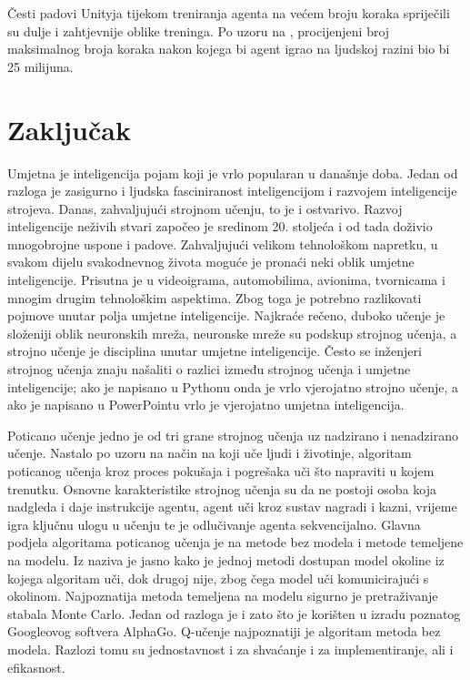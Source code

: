 \documentclass[]{foi} %
\begin{document}
Česti padovi Unityja tijekom treniranja agenta na većem broju koraka spriječili su dulje i zahtjevnije oblike treninga. Po uzoru na \cite{flappy}, procijenjeni broj maksimalnog broja koraka nakon kojega bi agent igrao na ljudskoj razini bio bi 25 milijuna.

\chapter{Zaključak}
Umjetna je inteligencija pojam koji je vrlo popularan u današnje doba. Jedan od razloga je zasigurno i ljudska fasciniranost inteligencijom i razvojem inteligencije strojeva. Danas, zahvaljujući strojnom učenju, to je i ostvarivo. Razvoj inteligencije neživih stvari započeo je sredinom 20. stoljeća i od tada doživio mnogobrojne uspone i padove. Zahvaljujući velikom tehnološkom napretku, u svakom dijelu svakodnevnog života moguće je pronaći neki oblik umjetne inteligencije. Prisutna je u videoigrama, automobilima, avionima, tvornicama i mnogim drugim tehnološkim aspektima. Zbog toga je potrebno razlikovati pojmove unutar polja umjetne inteligencije. Najkraće rečeno, duboko učenje je složeniji oblik neuronskih mreža, neuronske mreže su podskup strojnog učenja, a strojno učenje je disciplina unutar umjetne inteligencije. Često se inženjeri strojnog učenja znaju našaliti o razlici između strojnog učenja i umjetne inteligencije; ako je napisano u Pythonu onda je vrlo vjerojatno strojno učenje, a ako je napisano u PowerPointu vrlo je vjerojatno umjetna inteligencija.

Poticano učenje jedno je od tri grane strojnog učenja uz nadzirano i nenadzirano učenje. Nastalo po uzoru na način na koji uče ljudi i životinje, algoritam poticanog učenja kroz proces pokušaja i pogrešaka uči što napraviti u kojem trenutku. Osnovne karakteristike strojnog učenja su da ne postoji osoba koja nadgleda i daje instrukcije agentu, agent uči kroz sustav nagradi i kazni, vrijeme igra ključnu ulogu u učenju te je odlučivanje agenta sekvencijalno. Glavna podjela algoritama poticanog učenja je na metode bez modela i metode temeljene na modelu. Iz naziva je jasno kako je jednoj metodi dostupan model okoline iz kojega algoritam uči, dok drugoj nije, zbog čega model uči komunicirajući s okolinom. Najpoznatija metoda temeljena na modelu sigurno je pretraživanje stabala Monte Carlo. Jedan od razloga je i zato što je korišten u izradu poznatog Googleovog softvera AlphaGo. Q-učenje najpoznatiji je algoritam metoda bez modela. Razlozi tomu su jednostavnost i za shvaćanje i za implementiranje, ali i efikasnost.
\end{document}
